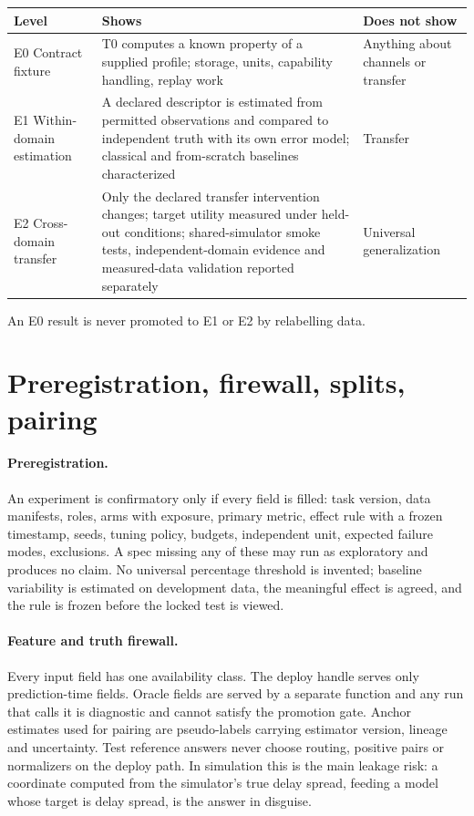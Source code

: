 \documentclass[11pt,a4paper]{article}
\begin{document}
\begin{center}\small
\begin{tabular}{@{}lp{6.6cm}p{4.4cm}@{}}
\toprule
Level & Shows & Does not show \\
\midrule
E0 Contract fixture & T0 computes a known property of a supplied profile; storage, units, capability handling, replay work & Anything about channels or transfer \\
E1 Within-domain estimation & A declared descriptor is estimated from permitted observations and compared to independent truth with its own error model; classical and from-scratch baselines characterized & Transfer \\
E2 Cross-domain transfer & Only the declared transfer intervention changes; target utility measured under held-out conditions; shared-simulator smoke tests, independent-domain evidence and measured-data validation reported separately & Universal generalization \\
\bottomrule
\end{tabular}
\end{center}
An E0 result is never promoted to E1 or E2 by relabelling data.

\section{Preregistration, firewall, splits, pairing}

\paragraph{Preregistration.} An experiment is confirmatory only if every field is filled: task version, data manifests, roles, arms with exposure, primary metric, effect rule with a frozen timestamp, seeds, tuning policy, budgets, independent unit, expected failure modes, exclusions. A spec missing any of these may run as exploratory and produces no claim. No universal percentage threshold is invented; baseline variability is estimated on development data, the meaningful effect is agreed, and the rule is frozen before the locked test is viewed.

\paragraph{Feature and truth firewall.} Every input field has one availability class. The deploy handle serves only prediction-time fields. Oracle fields are served by a separate function and any run that calls it is diagnostic and cannot satisfy the promotion gate. Anchor estimates used for pairing are pseudo-labels carrying estimator version, lineage and uncertainty. Test reference answers never choose routing, positive pairs or normalizers on the deploy path. In simulation this is the main leakage risk: a coordinate computed from the simulator's true delay spread, feeding a model whose target is delay spread, is the answer in disguise.
\end{document}
